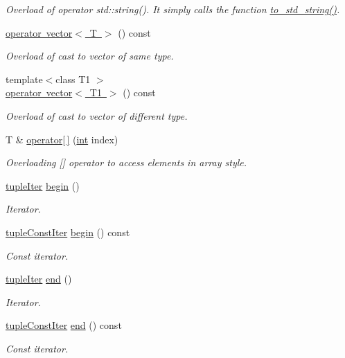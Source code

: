 \begin{DoxyCompactItemize}
\begin{DoxyCompactList}\small\item\em Overload of operator std\+::string(). It simply calls the function {\ttfamily \mbox{\hyperlink{class_tuple_a2c8e5f6fb1abb2b11ab222b7ce772569}{to\+\_\+std\+\_\+string()}}}. \end{DoxyCompactList}\item 
\mbox{\hyperlink{class_tuple_a4189d6fe009e00fbc81061bcad9ee856}{operator vector$<$ T $>$}} () const
\begin{DoxyCompactList}\small\item\em Overload of cast to vector of same type. \end{DoxyCompactList}\item 
{\footnotesize template$<$class T1 $>$ }\\\mbox{\hyperlink{class_tuple_a924a25df1578ffab148c69a1a1000491}{operator vector$<$ T1 $>$}} () const
\begin{DoxyCompactList}\small\item\em Overload of cast to vector of different type. \end{DoxyCompactList}\item 
T \& \mbox{\hyperlink{class_tuple_ae18a93053af932997709798b3fd5d12d}{operator\mbox{[}$\,$\mbox{]}}} (\mbox{\hyperlink{draw_8hh_aa620a13339ac3a1177c86edc549fda9b}{int}} index)
\begin{DoxyCompactList}\small\item\em Overloading \mbox{[}\mbox{]} operator to access elements in array style. \end{DoxyCompactList}\item 
\mbox{\hyperlink{maths_8hh_ad22dcdeefda7d41523cc1604953eb6cc}{tuple\+Iter}} \mbox{\hyperlink{class_tuple_a205dfb3c3dcad03ced830b5c9687d225}{begin}} ()
\begin{DoxyCompactList}\small\item\em Iterator. \end{DoxyCompactList}\item 
\mbox{\hyperlink{maths_8hh_a2eba794860251c1b30e532df32ee4d1b}{tuple\+Const\+Iter}} \mbox{\hyperlink{class_tuple_ab5d618dac69995db6adb0e657cd73bb3}{begin}} () const
\begin{DoxyCompactList}\small\item\em Const iterator. \end{DoxyCompactList}\item 
\mbox{\hyperlink{maths_8hh_ad22dcdeefda7d41523cc1604953eb6cc}{tuple\+Iter}} \mbox{\hyperlink{class_tuple_a345d8a3efbf58fe4cc7295c3cf66e8ab}{end}} ()
\begin{DoxyCompactList}\small\item\em Iterator. \end{DoxyCompactList}\item 
\mbox{\hyperlink{maths_8hh_a2eba794860251c1b30e532df32ee4d1b}{tuple\+Const\+Iter}} \mbox{\hyperlink{class_tuple_ac55a72437773f17dd8fbccf866d7e7eb}{end}} () const
\begin{DoxyCompactList}\small\item\em Const iterator. \end{DoxyCompactList}\end{DoxyCompactItemize}
